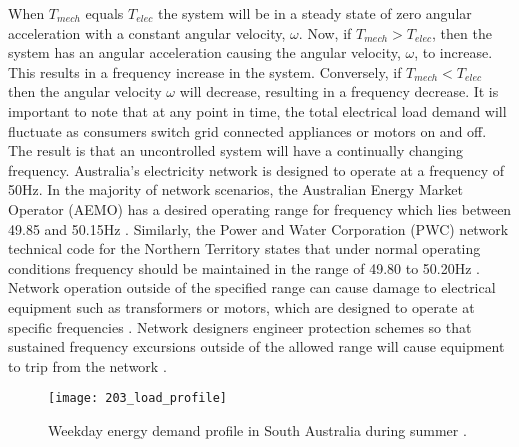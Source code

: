 When $T_{mech}$ equals $T_{elec}$ the system will be in a steady state of zero angular acceleration with a constant angular velocity, $\omega$. Now, if $T_{mech} > T_{elec}$, then the system has an angular acceleration causing the angular velocity, $\omega$, to increase. This results in a frequency increase in the system. Conversely, if $T_{mech} < T_{elec}$ then the angular velocity $\omega$ will decrease, resulting in a frequency decrease. It is important to note that at any point in time, the total electrical load demand will fluctuate as consumers switch grid connected appliances or motors on and off. The result is that an uncontrolled system will have a continually changing frequency. Australia's electricity network is designed to operate at a frequency of 50$\si{\hertz}$. In the majority of network scenarios, the Australian Energy Market Operator (AEMO) has a desired operating range for frequency which lies between 49.85 and 50.15$\si{\hertz}$ \cite{AEMOfreqdev}. Similarly, the Power and Water Corporation (PWC) network technical code for the Northern Territory states that under normal operating conditions frequency should be maintained in the range of 49.80 to 50.20$\si{\hertz}$ \cite{Pwc2013}. Network operation outside of the specified range can cause damage to electrical equipment such as transformers or motors, which are designed to operate at specific frequencies \cite{Sen2014}. Network designers engineer protection schemes so that sustained frequency excursions outside of the allowed range will cause equipment to trip from the network \cite{AEMOpowerfreqriskrev}.

\begin{figure}[ht]
	\centering
	\texttt{[image: 203\_load\_profile]}
	\caption[Intraday load demand profile]{Weekday energy demand profile in South Australia during summer \cite{Aemosaenergyrep}.}
	\label{fig:203_load_profile}
\end{figure}

\newpage

